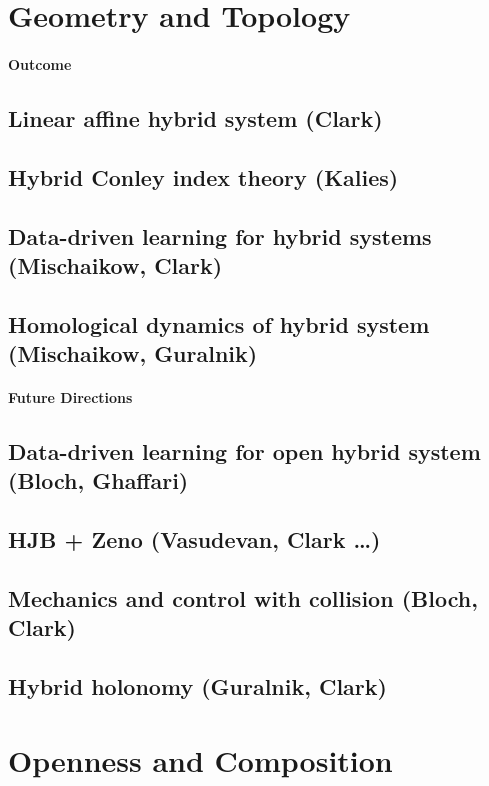 \documentclass[letterpaper,11pt]{article}
\begin{document}
\newpage

\section{Geometry and Topology}
\paragraph*{Outcome}
\subsection{Linear affine hybrid system (Clark)}
\subsection{Hybrid Conley index theory (Kalies)}
\subsection{Data-driven learning for hybrid systems (Mischaikow, Clark)}
\subsection{Homological dynamics of hybrid system (Mischaikow, Guralnik)}
\paragraph*{Future Directions}
\subsection{Data-driven learning for open hybrid system (Bloch, Ghaffari)}
\subsection{HJB + Zeno (Vasudevan, Clark …)}
\subsection{Mechanics and control with collision (Bloch, Clark)}
\subsection{Hybrid holonomy (Guralnik, Clark)}
\vspace*{0.3cm}

\section{Openness and Composition}
\end{document}
